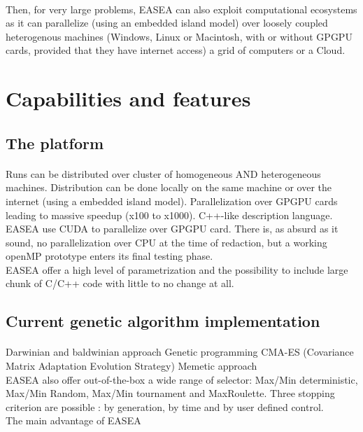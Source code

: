 \documentclass{book}
\begin{document}
\paragraph{} %
\label{par:}
  
Then, for very large problems, EASEA can also exploit computational ecosystems as it can parallelize (using an embedded island model) over loosely coupled heterogenous machines (Windows, Linux or Macintosh, with or without GPGPU cards, provided that they have internet access) a grid of computers or a Cloud.

\section{Capabilities and features} %
\label{sec:Capabilities}

  \subsection{The platform} %
  \label{sub:subsection name}
  \paragraph{} %
  \label{par:}
  
    Runs can be distributed over cluster of homogeneous AND heterogeneous machines.
    Distribution can be done locally on the same machine or over the internet (using a embedded island model).
    Parallelization over GPGPU cards leading to massive speedup (x100 to x1000).
    C++-like description language.
    \\
  EASEA use CUDA to parallelize over GPGPU card. There is, as absurd as it sound, no
  parallelization over CPU at the time of redaction, but a working openMP prototype
  enters its final testing phase.
  \\
  EASEA offer a high level of parametrization and the possibility to include large
  chunk of C/C++ code with little to no change at all.
    \subsection{Current genetic algorithm implementation} %
    \label{sub:current genetic algorithm implementation}
    \paragraph{} %
    \label{par:}
    Darwinian and baldwinian approach
    Genetic programming
    CMA-ES (Covariance Matrix Adaptation Evolution Strategy)
    Memetic approach 
\\
    EASEA also offer out-of-the-box a wide range of selector: Max/Min deterministic,
    Max/Min Random, Max/Min tournament and MaxRoulette.
    Three stopping criterion are possible : by generation, by time and by user
    defined control.
\\
    The main advantage of EASEA 
\end{document}
